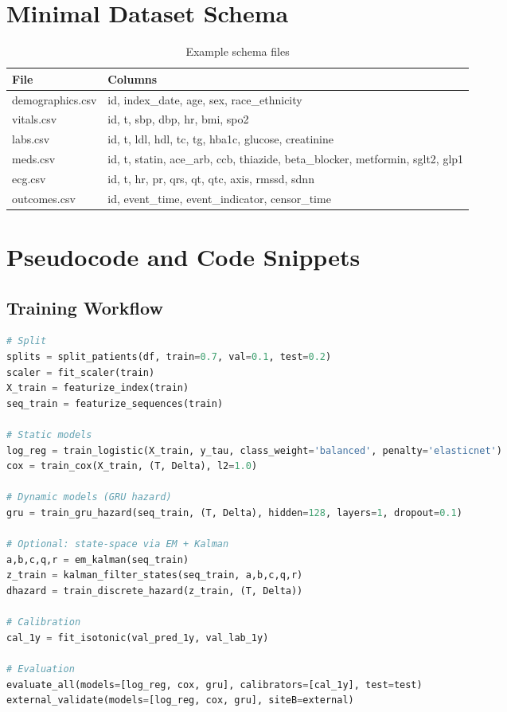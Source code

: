 \documentclass[11pt]{article}
\begin{document}
\section{Minimal Dataset Schema}
\begin{table}[H]
  \centering
  \caption{Example schema files}
  \begin{tabular}{ll}
    \toprule
    File & Columns \\
    \midrule
    demographics.csv & id, index\_date, age, sex, race\_ethnicity \\
    vitals.csv & id, t, sbp, dbp, hr, bmi, spo2 \\
    labs.csv & id, t, ldl, hdl, tc, tg, hba1c, glucose, creatinine \\
    meds.csv & id, t, statin, ace\_arb, ccb, thiazide, beta\_blocker, metformin, sglt2, glp1 \\
    ecg.csv & id, t, hr, pr, qrs, qt, qtc, axis, rmssd, sdnn \\
    outcomes.csv & id, event\_time, event\_indicator, censor\_time \\
    \bottomrule
  \end{tabular}
\end{table}

\section{Pseudocode and Code Snippets}
\subsection*{Training Workflow}
\begin{lstlisting}[language=Python,caption={Training and evaluation skeleton}]
# Split
splits = split_patients(df, train=0.7, val=0.1, test=0.2)
scaler = fit_scaler(train)
X_train = featurize_index(train)
seq_train = featurize_sequences(train)

# Static models
log_reg = train_logistic(X_train, y_tau, class_weight='balanced', penalty='elasticnet')
cox = train_cox(X_train, (T, Delta), l2=1.0)

# Dynamic models (GRU hazard)
gru = train_gru_hazard(seq_train, (T, Delta), hidden=128, layers=1, dropout=0.1)

# Optional: state-space via EM + Kalman
a,b,c,q,r = em_kalman(seq_train)
z_train = kalman_filter_states(seq_train, a,b,c,q,r)
dhazard = train_discrete_hazard(z_train, (T, Delta))

# Calibration
cal_1y = fit_isotonic(val_pred_1y, val_lab_1y)

# Evaluation
evaluate_all(models=[log_reg, cox, gru], calibrators=[cal_1y], test=test)
external_validate(models=[log_reg, cox, gru], siteB=external)
\end{lstlisting}
\end{document}
